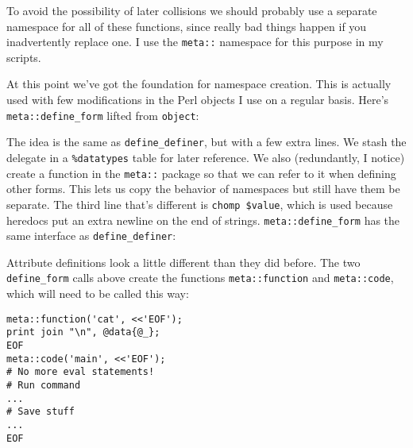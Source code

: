 \documentclass{report}
\begin{document}
    To avoid the possibility of later collisions we should probably use a separate namespace for all of these functions, since really bad things happen if you inadvertently replace one. I use
    the {\tt meta::} namespace for this purpose in my scripts.

    At this point we've got the foundation for namespace creation. This is actually used with few modifications in the Perl objects I use on a regular basis. Here's \verb|meta::define_form|
    lifted from {\tt object}:


    The idea is the same as \verb|define_definer|, but with a few extra lines. We stash the delegate in a \verb|%datatypes| table for later reference. We also (redundantly, I notice) create a
    function in the {\tt meta::} package so that we can refer to it when defining other forms. This lets us copy the behavior of namespaces but still have them be separate. The third line
    that's different is \verb|chomp $value|, which is used because heredocs put an extra newline on the end of strings. \verb|meta::define_form| has the same interface as
    \verb|define_definer|:


    Attribute definitions look a little different than they did before. The two \verb|define_form| calls above create the functions {\tt meta::function} and {\tt meta::code}, which will need
    to be called this way:

\begin{verbatim}
meta::function('cat', <<'EOF');
print join "\n", @data{@_};
EOF
meta::code('main', <<'EOF');
# No more eval statements!
# Run command
...
# Save stuff
...
EOF
\end{verbatim}
\end{document}
